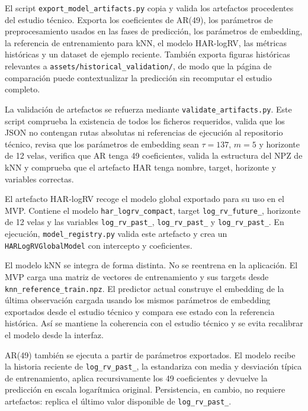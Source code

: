 El script \texttt{export\_\allowbreak model\_\allowbreak artifacts.py} copia y valida los artefactos procedentes del estudio técnico. Exporta los coeficientes de AR(49), los parámetros de preprocesamiento usados en las fases de predicción, los parámetros de embedding, la referencia de entrenamiento para kNN, el modelo HAR-logRV, las métricas históricas y un dataset de ejemplo reciente. También exporta figuras históricas relevantes a \texttt{assets/\allowbreak historical\_\allowbreak validation/}, de modo que la página de comparación puede contextualizar la predicción sin recomputar el estudio completo.

La validación de artefactos se refuerza mediante \texttt{validate\_\allowbreak artifacts.py}. Este script comprueba la existencia de todos los ficheros requeridos, valida que los JSON no contengan rutas absolutas ni referencias de ejecución al repositorio técnico, revisa que los parámetros de embedding sean \(\tau=137\), \(m=5\) y horizonte de 12 velas, verifica que AR tenga 49 coeficientes, valida la estructura del NPZ de kNN y comprueba que el artefacto HAR tenga nombre, target, horizonte y variables correctas.

El artefacto HAR-logRV recoge el modelo global exportado para su uso en el MVP. Contiene el modelo \texttt{har\_\allowbreak logrv\_\allowbreak compact}, target \texttt{log\_\allowbreak rv\_\allowbreak future\_}, horizonte de 12 velas y las variables \texttt{log\_\allowbreak rv\_\allowbreak past\_}, \texttt{log\_\allowbreak rv\_\allowbreak past\_} y \texttt{log\_\allowbreak rv\_\allowbreak past\_}. En ejecución, \texttt{model\_\allowbreak registry.py} valida este artefacto y crea un \texttt{HARLogRVGlobalModel} con intercepto y coeficientes.

El modelo kNN se integra de forma distinta. No se reentrena en la aplicación. El MVP carga una matriz de vectores de entrenamiento y sus targets desde \texttt{knn\_\allowbreak reference\_\allowbreak train.npz}. El predictor actual construye el embedding de la última observación cargada usando los mismos parámetros de embedding exportados desde el estudio técnico y compara ese estado con la referencia histórica. Así se mantiene la coherencia con el estudio técnico y se evita recalibrar el modelo desde la interfaz.

AR(49) también se ejecuta a partir de parámetros exportados. El modelo recibe la historia reciente de \texttt{log\_\allowbreak rv\_\allowbreak past\_}, la estandariza con media y desviación típica de entrenamiento, aplica recursivamente los 49 coeficientes y devuelve la predicción en escala logarítmica original. Persistencia, en cambio, no requiere artefactos: replica el último valor disponible de \texttt{log\_\allowbreak rv\_\allowbreak past\_}.

